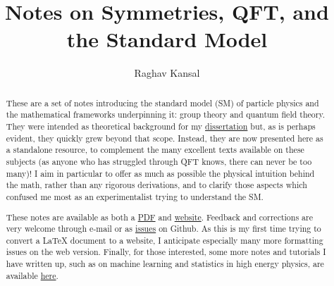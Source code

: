 \documentclass[12pt]{report}
\title{Notes on Symmetries, QFT, and the Standard Model}
\author{Raghav Kansal}
\theoremstyle{definition}
\theoremstyle{definition}
\theoremstyle{definition}
\numberwithin{equation}{chapter}
\begin{document}

\maketitle

\begin{abstract}
\begin{doublespace}
\setlength{\parskip}{\baselineskip}
These are a set of notes introducing the standard model (SM) of particle physics and the mathematical frameworks underpinning it: group theory and quantum field theory.
They were intended as theoretical background for my \href{https://www.raghavkansal.com}{dissertation} but, as is perhaps evident, they quickly grew beyond that scope.
Instead, they are now presented here as a standalone resource, to complement the many excellent texts available on these subjects (as anyone who has struggled through QFT knows, there can never be too many)!
I aim in particular to offer as much as possible the physical intuition behind the math, rather than any rigorous derivations, and to clarify those aspects which confused me most as an experimentalist trying to understand the SM.

These notes are available as both a \href{https://github.com/rkansal47/standard-model/blob/gh-pages/standard-model.pdf?raw=true}{PDF} and \href{https://rkansal47.github.io/standard-model}{website}.
Feedback and corrections are very welcome through e-mail or as \href{https://github.com/rkansal47/standard-model/issues}{issues} on Github.
As this is my first time trying to convert a LaTeX document to a website, I anticipate especially many more formatting issues on the web version.
Finally, for those interested, some more notes and tutorials I have written up, such as on machine learning and statistics in high energy physics, are available \href{https://www.raghavkansal.com/teaching/}{here}.
\end{doublespace}
\end{abstract}


{
\hypersetup{linkcolor=black}
\tableofcontents
}

\setlength{\parskip}{\baselineskip}

\begin{doublespace}




\end{doublespace}

\nocite{apsrev42Control}

\end{document}
